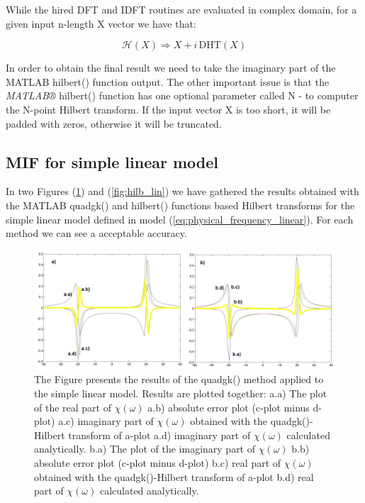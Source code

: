 \documentclass[12pt,twoside,a4paper]{article}
\numberwithin{equation}{subsection}
\numberwithin{figure}{subsection}
\begin{document}
While the hired DFT and IDFT routines are evaluated in complex domain, for a given input n-length X vector we have that:

\begin{equation} \label{eq:matlab_implication}
	\mathcal{H}(X) \Rightarrow X + i \, \mathrm{DHT}(X)
\end{equation}

In order to obtain the final result we need to take the imaginary part of the MATLAB hilbert() function output. The other important issue is that the \textit{MATLAB®} hilbert() function has one optional parameter called N - to computer the N-point Hilbert transform. If the input vector X is too short, it will be padded with zeros, otherwise it will be truncated. 

\subsection{MIF for simple linear model} \label{chap:matlab_lin}

In two Figures (\ref{fig:quadgk_lin}) and (\ref{fig:hilb_lin}) we have ga\-thered the results ob\-tained with the MATLAB quadgk() and hilbert() functions based Hil\-bert trans\-forms for the simple linear model defined in model (\ref{eq:physical_frequency_linear}). For each method we can see a accep\-table accu\-racy.

\begin{figure} 
  \includegraphics[width=150mm]{img/quadgk_lin.png}
  \caption{The Figure presents the results of the quadgk() method applied to the simple linear model. Results are plotted together:
   a.a) The plot of the real part of $\chi (\omega )$ 
   a.b) absolute error plot (c-plot minus d-plot) 
   a.c) imaginary part of $\chi (\omega )$ obtained with the quadgk()-Hilbert transform of a-plot 
   a.d) imaginary part of $\chi (\omega )$  calculated analytically. 
   b.a) The plot of the imaginary part of $\chi (\omega )$ 
   b.b) absolute error plot (c-plot minus d-plot) 
   b.c) real part of $\chi (\omega )$ obtained with the quadgk()-Hilbert transform of a-plot 
   b.d) real part of $\chi (\omega )$ calculated analytically. \label{fig:quadgk_lin}
  }
\end{figure}
\end{document}
